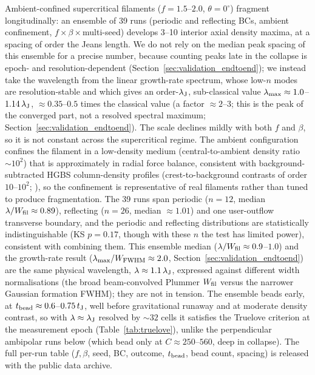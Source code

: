\documentclass[usenatbib,twoside,twocolumn]{mnras}
\begin{document}
Ambient-confined supercritical filaments ($f=1.5$--$2.0$, $\theta=0^\circ$) fragment longitudinally: an ensemble of 39 runs (periodic and reflecting BCs, ambient confinement, $f\times\beta\times$multi-seed) develops 3--10 interior axial density maxima, at a spacing of order the Jeans length. We do not rely on the median peak spacing of this ensemble for a precise number, because counting peaks late in the collapse is epoch- and resolution-dependent (Section~\ref{sec:validation_endtoend}); we instead take the wavelength from the linear growth-rate spectrum, whose low-$n$ modes are resolution-stable and which gives an order-$\lambda_{\rm J}$, sub-classical value $\lambda_{\rm max}\approx1.0$--$1.14\,\lambda_{\rm J}$, $\approx0.35$--$0.5$ times the classical value (a factor $\approx2$--$3$; this is the peak of the converged part, not a resolved spectral maximum; Section~\ref{sec:validation_endtoend}). The scale declines mildly with both $f$ and $\beta$, so it is not constant across the supercritical regime. The ambient configuration confines the filament in a low-density medium (central-to-ambient density ratio $\sim10^2$) that is approximately in radial force balance, consistent with background-subtracted HGBS column-density profiles (crest-to-background contrasts of order $10$--$10^2$; \citealt{Arzoumanian2019}), so the confinement is representative of real filaments rather than tuned to produce fragmentation. The 39 runs span periodic ($n=12$, median $\lambda/W_{\rm fil}\approx0.89$), reflecting ($n=26$, median $\approx1.01$) and one user-outflow transverse boundary, and the periodic and reflecting distributions are statistically indistinguishable (KS $p=0.17$, though with these $n$ the test has limited power), consistent with combining them. This ensemble median ($\lambda/W_{\rm fil}\approx0.9$--$1.0$) and the growth-rate result ($\lambda_{\rm max}/W_{\rm FWHM}\approx2.0$, Section~\ref{sec:validation_endtoend}) are the same physical wavelength, $\lambda\approx1.1\,\lambda_{\rm J}$, expressed against different width normalisations (the broad beam-convolved Plummer $W_{\rm fil}$ versus the narrower Gaussian formation FWHM); they are not in tension. The ensemble beads early, at $t_{\rm bead}\approx0.6$--$0.75\,t_{\rm J}$, well before gravitational runaway and at moderate density contrast, so with $\lambda\approx\lambda_{\rm J}$ resolved by ${\sim}32$ cells it satisfies the Truelove criterion at the measurement epoch (Table~\ref{tab:truelove}), unlike the perpendicular ambipolar runs below (which bead only at $C\approx250$--$560$, deep in collapse). The full per-run table ($f,\beta$, seed, BC, outcome, $t_{\rm bead}$, bead count, spacing) is released with the public data archive.
\end{document}
